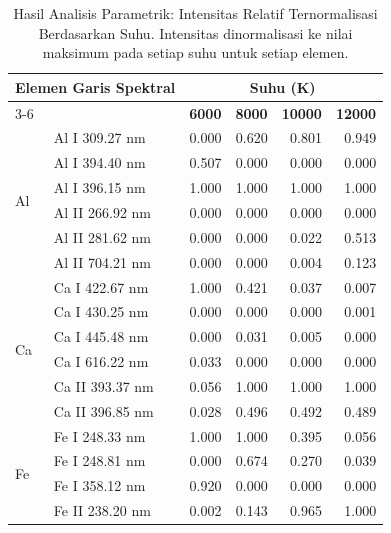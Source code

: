\begin{table}[H]
    \centering
    \caption{Hasil Analisis Parametrik: Intensitas Relatif Ternormalisasi Berdasarkan Suhu. Intensitas dinormalisasi ke nilai maksimum pada setiap suhu untuk setiap elemen.}
    \label{tab:analisis_parametrik_suhu}
    \small
    \begin{tabular}{llrrrr}
        \toprule
        \multicolumn{2}{l}{\textbf{Elemen Garis Spektral}} & \multicolumn{4}{c}{\textbf{Suhu (K)}} \\
        \cmidrule(lr){3-6}
        & & \textbf{6000} & \textbf{8000} & \textbf{10000} & \textbf{12000} \\
        \midrule
        \multirow{6}{*}{Al} & Al I 309.27 nm   & 0.000 & 0.620 & 0.801 & 0.949 \\
                            & Al I 394.40 nm   & 0.507 & 0.000 & 0.000 & 0.000 \\
                            & Al I 396.15 nm   & 1.000 & 1.000 & 1.000 & 1.000 \\
                            & Al II 266.92 nm  & 0.000 & 0.000 & 0.000 & 0.000 \\
                            & Al II 281.62 nm  & 0.000 & 0.000 & 0.022 & 0.513 \\
                            & Al II 704.21 nm  & 0.000 & 0.000 & 0.004 & 0.123 \\
        \midrule
        \multirow{6}{*}{Ca} & Ca I 422.67 nm   & 1.000 & 0.421 & 0.037 & 0.007 \\
                            & Ca I 430.25 nm   & 0.000 & 0.000 & 0.000 & 0.001 \\
                            & Ca I 445.48 nm   & 0.000 & 0.031 & 0.005 & 0.000 \\
                            & Ca I 616.22 nm   & 0.033 & 0.000 & 0.000 & 0.000 \\
                            & Ca II 393.37 nm  & 0.056 & 1.000 & 1.000 & 1.000 \\
                            & Ca II 396.85 nm  & 0.028 & 0.496 & 0.492 & 0.489 \\
        \midrule
        \multirow{5}{*}{Fe} & Fe I 248.33 nm   & 1.000 & 1.000 & 0.395 & 0.056 \\
                            & Fe I 248.81 nm   & 0.000 & 0.674 & 0.270 & 0.039 \\
                            & Fe I 358.12 nm   & 0.920 & 0.000 & 0.000 & 0.000 \\
                            & Fe II 238.20 nm  & 0.002 & 0.143 & 0.965 & 1.000 \\

\end{tabular}
\end{table}

